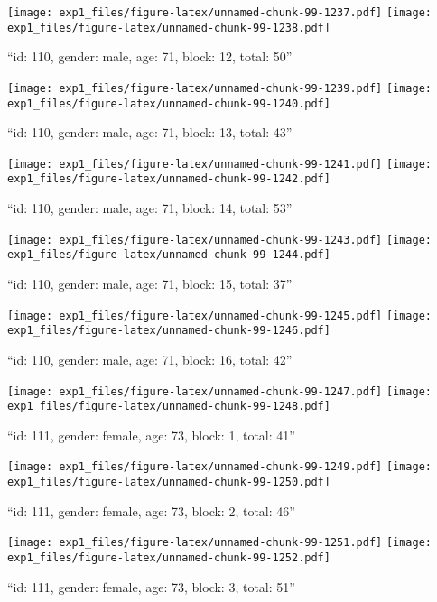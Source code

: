 \documentclass[,]{article}
\begin{document}
\texttt{[image: exp1\_files/figure-latex/unnamed-chunk-99-1237.pdf]}
\texttt{[image: exp1\_files/figure-latex/unnamed-chunk-99-1238.pdf]}

\newpage
[1] 

``id: 110, gender: male, age: 71, block: 12, total: 50''

\texttt{[image: exp1\_files/figure-latex/unnamed-chunk-99-1239.pdf]}
\texttt{[image: exp1\_files/figure-latex/unnamed-chunk-99-1240.pdf]}

\newpage
[1] 

``id: 110, gender: male, age: 71, block: 13, total: 43''

\texttt{[image: exp1\_files/figure-latex/unnamed-chunk-99-1241.pdf]}
\texttt{[image: exp1\_files/figure-latex/unnamed-chunk-99-1242.pdf]}

\newpage
[1] 

``id: 110, gender: male, age: 71, block: 14, total: 53''

\texttt{[image: exp1\_files/figure-latex/unnamed-chunk-99-1243.pdf]}
\texttt{[image: exp1\_files/figure-latex/unnamed-chunk-99-1244.pdf]}

\newpage
[1] 

``id: 110, gender: male, age: 71, block: 15, total: 37''

\texttt{[image: exp1\_files/figure-latex/unnamed-chunk-99-1245.pdf]}
\texttt{[image: exp1\_files/figure-latex/unnamed-chunk-99-1246.pdf]}

\newpage
[1] 

``id: 110, gender: male, age: 71, block: 16, total: 42''

\texttt{[image: exp1\_files/figure-latex/unnamed-chunk-99-1247.pdf]}
\texttt{[image: exp1\_files/figure-latex/unnamed-chunk-99-1248.pdf]}

\newpage
[1] 

``id: 111, gender: female, age: 73, block: 1, total: 41''

\texttt{[image: exp1\_files/figure-latex/unnamed-chunk-99-1249.pdf]}
\texttt{[image: exp1\_files/figure-latex/unnamed-chunk-99-1250.pdf]}

\newpage
[1] 

``id: 111, gender: female, age: 73, block: 2, total: 46''

\texttt{[image: exp1\_files/figure-latex/unnamed-chunk-99-1251.pdf]}
\texttt{[image: exp1\_files/figure-latex/unnamed-chunk-99-1252.pdf]}

\newpage
[1] 

``id: 111, gender: female, age: 73, block: 3, total: 51''
\end{document}
